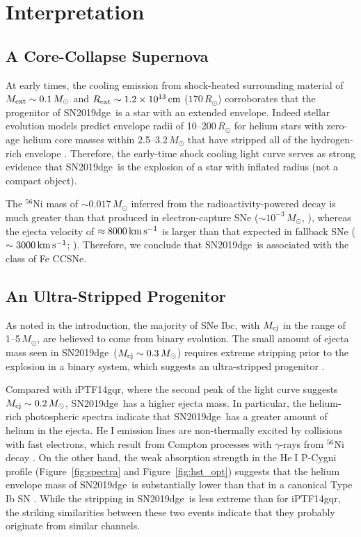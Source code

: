 \documentclass[twocolumn]{aastex63}
\newcommand{\name}{SN2019dge}
\def\ion#1#2{#1$\;${\footnotesize\rm{#2}}\relax}
\begin{document}
\section{Interpretation} \label{sec:interpretation}
\subsection{A Core-Collapse Supernova}
At early times, the cooling emission from shock-heated surrounding material of $M_{\rm 
ext}\sim0.1\,M_\odot$ and {\color{red}$R_{\rm ext}\sim 1.2\times 10^{13}\,{\rm cm}$ ($170\,{ R_\odot}$)} 
corroborates that the progenitor of \name\ is a star with an extended envelope. Indeed stellar evolution 
models predict envelope radii of 10--200\,$R_\odot$ for helium stars with zero-age helium core masses 
within 2.5--3.2\,$M_\odot$ that have stripped all of the hydrogen-rich envelope \citep{Woosley2019, 
Laplace2020}. Therefore, the early-time shock cooling 
light curve serves as strong evidence that \name\ is the explosion of a star with inflated radius (not a 
compact object).

The $^{56}$Ni mass of $\sim 0.017\,M_\odot$ inferred from the radioactivity-powered decay 
is much greater than that produced in electron-capture SNe ($\sim10^{-3}\,M_\odot$, 
\citealt{Moriya2014}), whereas the ejecta velocity of $\approx8000\,{\rm km\, s^{-1}}$ is 
larger than that expected in fallback SNe ($\sim3000\,{\rm km\,s^{-1}}$; \citealt{Moriya2010}). 
Therefore, we conclude that \name\ is associated with the class of Fe CCSNe.

\subsection{An Ultra-Stripped Progenitor}
As noted in the introduction, the majority of SNe Ibc, with $M_{\rm ej}$ in the range of 
1--5\,$M_\odot$, are believed to come from binary evolution. The small amount of ejecta mass seen in 
\name\ ($M_{\rm ej}\sim 0.3\, M_\odot$) requires extreme stripping prior to the explosion in a 
binary system, which suggests an ultra-stripped progenitor \citep{Tauris2013}. 

Compared with iPTF14gqr, where the second peak of the light curve suggests $M_{\rm ej}\sim 
0.2\,M_\odot$, \name\ has a higher ejecta mass. In particular, the helium-rich photospheric 
spectra indicate that \name\ has a greater amount of helium in the ejecta. \ion{He}{I} emission lines are 
non-thermally excited by collisions with fast electrons, which result from Compton processes with 
$\gamma$-rays from $^{56}$Ni decay \citep{Dessart2012, Hachinger2012}. On the other hand, the 
weak absorption strength in the \ion{He}{I} P-Cygni profile (Figure~\ref{fig:spectra} and 
Figure~\ref{fig:hst_opt}) suggests that the helium envelope mass of \name\ is substantially lower than 
that in a canonical Type Ib SN \citep{Fremling2018}. While the stripping in \name\ is less extreme than 
for iPTF14gqr, the striking similarities between these two events indicate that they probably originate 
from similar channels. 
\end{document}
